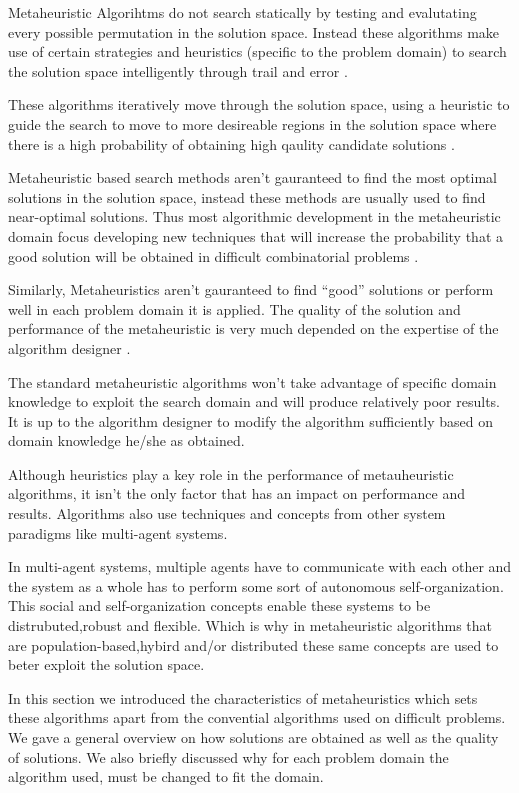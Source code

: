 Metaheuristic Algorihtms do not search statically by testing and evalutating every possible permutation in the solution space. Instead these algorithms make use of certain strategies and heuristics (specific to the problem domain) to search the solution space intelligently through trail and error \cite{MetaAgricultural}. 

These algorithms iteratively move through the solution space, using a heuristic to guide the search to move to more desireable regions in the solution space where there is a high probability of obtaining high qaulity candidate solutions \cite{HeuristicManipulation,SweepMeta}.

Metaheuristic based search methods aren't gauranteed to find the most optimal solutions in the solution space, instead these methods are usually used to find near-optimal solutions. Thus most algorithmic development in the metaheuristic domain focus developing new techniques that will increase the probability that a good solution will be obtained in difficult combinatorial problems \cite{MetaAgricultural}.

Similarly, Metaheuristics aren't gauranteed to find ``good'' solutions or perform well in each problem domain it is applied. The quality of the solution and performance of the metaheuristic is very much depended on the expertise of the algorithm designer \cite{AutoComplexMeta}. 

The standard metaheuristic algorithms won't take advantage of specific domain knowledge to exploit the search domain and will produce relatively poor results. It is up to the algorithm designer to modify the algorithm sufficiently based on domain knowledge he/she as obtained\cite{AutoComplexMeta}.

Although heuristics play a key role in the performance of metauheuristic algorithms, it isn't the only factor that has an impact on performance and results.  Algorithms also use techniques and concepts from other system paradigms like multi-agent systems. 

In multi-agent systems, multiple agents have to communicate with each other and the system as a whole has to perform some sort of autonomous self-organization. This social and self-organization concepts enable these systems to be distrubuted,robust and flexible. Which is why in metaheuristic algorithms that are population-based,hybird and/or distributed these same concepts are used to beter exploit the solution space\cite{Self-AdaptiveMeta}.

In this section we introduced the characteristics of metaheuristics which sets these algorithms apart from the convential algorithms used on difficult problems. We gave a general overview on how solutions are obtained as well as the quality of solutions. We also briefly discussed why for each problem domain the algorithm used, must be changed to fit the domain. 

